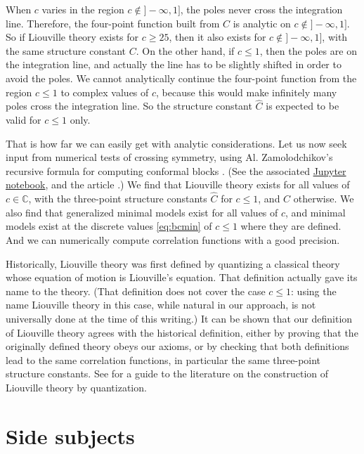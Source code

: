 \documentclass[12pt, a4paper]{article}
\theoremstyle{break}
\begin{document}
When $c$ varies in the region $c\notin ]-\infty,1]$, the poles never cross the integration line.
Therefore, 
the four-point function built from $C$ is analytic on $c\notin ]-\infty,1]$. 
So if Liouville theory exists for $c\geq 25$, then it also exists for $c\notin ]-\infty,1]$, with the same structure constant $C$. 
On the other hand, if $c\leq 1$, then the poles are on the integration line, and actually the line
has to be slightly shifted in order to avoid the poles. 
We cannot analytically continue the four-point function from the region $c\leq 1$ to complex values of $c$, because this would make infinitely many poles cross the integration line.
So the structure constant $\hat C$ is expected to be valid for $c\leq 1$ only.

That is how far we can easily get with analytic considerations. 
Let us now seek input from numerical tests of crossing symmetry, using Al. Zamolodchikov's recursive formula for computing conformal blocks \cite{zz90}. (See the associated \href{https://github.com/ribault/bootstrap-2d-Python/blob/master/Liouville_demo_2.ipynb}{Jupyter notebook}, and the article \cite{rs15}.)
We find that Liouville theory exists for all values of $c\in\mathbb{C}$, with the three-point structure constants $\hat C$ for $c\leq 1$, and $C$ otherwise.
We also find that generalized minimal models exist for all values of $c$, and minimal models exist at the discrete values \eqref{eq:bcmin} of $c\leq 1$ where they are defined. 
And we can numerically compute correlation functions with a good precision.

Historically, Liouville theory was first defined by quantizing a classical theory whose equation of motion is Liouville's equation. That definition actually gave its name to the theory. (That definition does not cover the case $c\leq 1$: using the name Liouville theory in this case, while natural in our approach, is not universally done at the time of this writing.) It can be shown that our definition of Liouville theory agrees with the historical definition, either by proving that the originally defined theory obeys our axioms, or by checking that both definitions lead to the same correlation functions, in particular the same three-point structure constants. See \cite{tes17} for a guide to the literature on the construction of Liouville theory by quantization. 

\appendix

\section{Side subjects}
\end{document}
